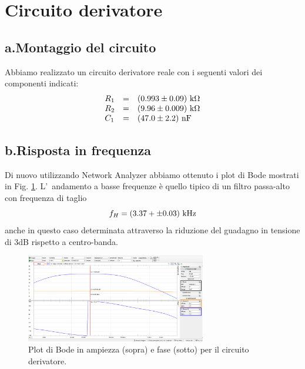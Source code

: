 \documentclass[10pt,a4paper]{article}
\begin{document}
\section{Circuito derivatore}
\subsection*{a.Montaggio del circuito}
Abbiamo realizzato un circuito derivatore reale con i seguenti valori dei componenti indicati: 
\[
\begin{array}{lll}
R_1 & = & (0.993 \pm 0.09) \  \rm k\Omega\\
R_2 & = & (9.96 \pm 0.009) \  \rm k\Omega\\ 
C_1 & = & (47.0 \pm 2.2) \  \rm nF
\end{array}
\]
%
\subsection*{b.Risposta in frequenza}
Di nuovo utilizzando Network Analyzer abbiamo ottenuto i plot di Bode mostrati
in Fig. \ref{fig:bodederiv}. 
L'~andamento a basse frequenze \`e quello tipico di un filtro passa-alto con frequenza di taglio 
\[
f_H = (3.37+ \pm 0.03 )  \  \rm kHz
\]
anche in questo caso determinata attraverso la riduzione del guadagno in tensione di 3dB rispetto a centro-banda. 
%
\begin{figure}[h]
\begin{center}
\includegraphics[width=0.7\textwidth]{bodeplot2.png}
\caption{\small Plot di Bode in ampiezza (sopra) e fase (sotto) per il circuito derivatore.}
\label{fig:bodederiv}
\end{center}
\end{figure}
%
\end{document}

